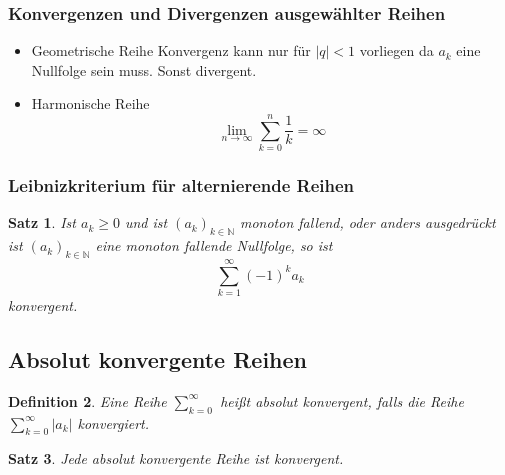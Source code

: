 \documentclass[12pt,a4paper]{report}%
\newtheorem{satz}{Satz}[section]
\newtheorem{definition}[satz]{Definition}
\numberwithin{equation}{section}
\newcommand{\N}{\mathbb{N}}
\numberwithin{equation}{subsection}
\begin{document}
	  \subsubsection{Konvergenzen und Divergenzen ausgewählter Reihen}
	  \begin{itemize}
	    \item Geometrische Reihe \newline
	    Konvergenz kann nur für $|q| < 1$ vorliegen da $a_k$ eine Nullfolge sein muss. Sonst divergent.
	    \item Harmonische Reihe \newline
	    \begin{equation}
	      \lim\limits_{n \rightarrow \infty} \sum\limits_{k = 0}^n \frac{1}{k} = \infty
	    \end{equation}
	  \end{itemize}
	  
	  \subsubsection{Leibnizkriterium für alternierende Reihen}
	  \begin{satz}
	    Ist $a_k \geq 0$ und ist $(a_k)_{k \in \N}$ monoton fallend, oder anders ausgedrückt ist $(a_k)_{k \in \N}$ eine monoton fallende Nullfolge, so ist
	    \begin{equation*}
	      \sum\limits_{k = 1}^{\infty} (-1)^k a_k
	    \end{equation*}
	    konvergent.
	  \end{satz}
  
  \subsection{Absolut konvergente Reihen}
  \begin{definition}
    Eine Reihe $\sum\limits_{k=0}^\infty$ heißt absolut konvergent, falls die Reihe $\sum\limits_{k=0}^\infty |a_k|$ konvergiert.
  \end{definition}
  \begin{satz}
    Jede absolut konvergente Reihe ist konvergent.
  \end{satz}
\end{document}
